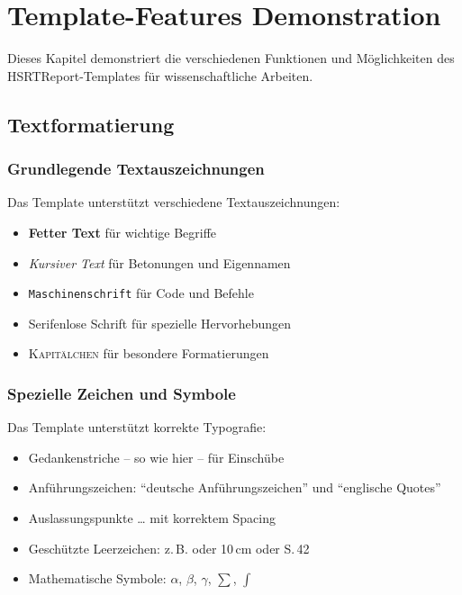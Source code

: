 
\chapter{Template-Features Demonstration}
\label{chap:template_demo}

Dieses Kapitel demonstriert die verschiedenen Funktionen und Möglichkeiten des HSRTReport-Templates für wissenschaftliche Arbeiten.

\section{Textformatierung}
\label{sec:textformatierung_demo}

\subsection*{Grundlegende Textauszeichnungen}
\label{subsec:textauszeichnungen}

Das Template unterstützt verschiedene Textauszeichnungen:
\begin{itemize}
	\item \textbf{Fetter Text} für wichtige Begriffe
	\item \emph{Kursiver Text} für Betonungen und Eigennamen
	\item \texttt{Maschinenschrift} für Code und Befehle
	\item \textsf{Serifenlose Schrift} für spezielle Hervorhebungen
	\item \textsc{Kapitälchen} für besondere Formatierungen
\end{itemize}

\subsection*{Spezielle Zeichen und Symbole}
\label{subsec:spezielle_zeichen}

Das Template unterstützt korrekte Typografie:
\begin{itemize}
	\item Gedankenstriche -- so wie hier -- für Einschübe
	\item Anführungszeichen: "`deutsche Anführungszeichen"' und ``englische Quotes''
	\item Auslassungspunkte \ldots{} mit korrektem Spacing
	\item Geschützte Leerzeichen: z.\,B. oder 10\,cm oder S.\,42
	\item Mathematische Symbole: $\alpha$, $\beta$, $\gamma$, $\sum$, $\int$
\end{itemize}

